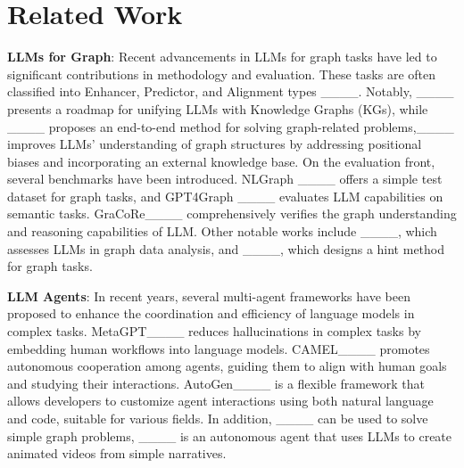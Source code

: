 \section{Related Work}
\textbf{LLMs for Graph}: Recent advancements in LLMs for graph tasks have led to significant contributions in methodology and evaluation. These tasks are often classified into Enhancer, Predictor, and Alignment types ____. Notably, ____ presents a roadmap for unifying LLMs with Knowledge Graphs (KGs), while ____ proposes an end-to-end method for solving graph-related problems,____ improves LLMs' understanding of graph structures by addressing positional biases and incorporating an external knowledge base. On the evaluation front, several benchmarks have been introduced. NLGraph ____ offers a simple test dataset for graph tasks, and GPT4Graph ____ evaluates LLM capabilities on semantic tasks. GraCoRe____ comprehensively verifies the graph understanding and reasoning capabilities of LLM. Other notable works include ____, which assesses LLMs in graph data analysis, and ____, which designs a hint method for graph tasks.

\noindent\textbf{LLM Agents}: In recent years, several multi-agent frameworks have been proposed to enhance the coordination and efficiency of language models in complex tasks. MetaGPT____ reduces hallucinations in complex tasks by embedding human workflows into language models. CAMEL____ promotes autonomous cooperation among agents, guiding them to align with human goals and studying their interactions. AutoGen____ is a flexible framework that allows developers to customize agent interactions using both natural language and code, suitable for various fields. In addition, ____ can be used to solve simple graph problems, ____ is an autonomous agent that uses LLMs to create animated videos from simple narratives.
